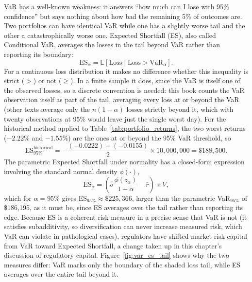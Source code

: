 \documentclass[../ai_in_finance]{subfiles}
\begin{document}
VaR has a well-known weakness: it answers ``how much can I lose with 95\% confidence'' but says nothing about how bad the remaining 5\% of outcomes are. Two portfolios can have identical VaR while one has a slightly worse tail and the other a catastrophically worse one. Expected Shortfall (ES), also called Conditional VaR, averages the losses in the tail beyond VaR rather than reporting its boundary:
\begin{equation}
\label{eq:marketrisk-es}
\text{ES}_\alpha = \mathbb{E}[\text{Loss} \mid \text{Loss} > \text{VaR}_\alpha].
\end{equation}
For a continuous loss distribution it makes no difference whether this inequality is strict ($>$) or not ($\geq$). In a finite sample it does, since the VaR is itself one of the observed losses, so a discrete convention is needed: this book counts the VaR observation itself as part of the tail, averaging every loss at or beyond the VaR (other texts average only the $n(1-\alpha)$ losses strictly beyond it, which with twenty observations at 95\% would leave just the single worst day). For the historical method applied to Table~\ref{tab:portfolio_returns}, the two worst returns ($-2.22\%$ and $-1.55\%$) are the ones at or beyond the 95\% VaR threshold, so
\begin{equation*}
\text{ES}_{95\%}^{\text{historical}} = -\frac{(-0.0222) + (-0.0155)}{2} \times 10{,}000{,}000 = \$188{,}500.
\end{equation*}
The parametric Expected Shortfall under normality has a closed-form expression involving the standard normal density $\phi(\cdot)$,
\begin{equation}
\label{eq:marketrisk-es-normal}
\text{ES}_\alpha = \left(\hat\sigma \frac{\phi(z_\alpha)}{1-\alpha} - \bar r\right) \times V,
\end{equation}
which for $\alpha=95\%$ gives $\text{ES}_{95\%} \approx \$225{,}366$, larger than the parametric VaR$_{95\%}$ of \$186,195, as it must be, since ES averages over the tail rather than reporting its edge.
Because ES is a coherent risk measure in a precise sense that VaR is not (it satisfies subadditivity, so diversification can never increase measured risk, which VaR can violate in pathological cases), regulators have shifted market-risk capital from VaR toward Expected Shortfall, a change taken up in this chapter's discussion of regulatory capital. Figure~\ref{fig:var_es_tail} shows why the two measures differ: VaR marks only the boundary of the shaded loss tail, while ES averages over the entire tail beyond it.
\end{document}
